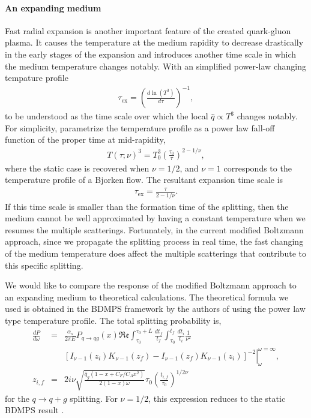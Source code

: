 \paragraph{An expanding medium}
Fast radial expansion is another important feature of the created quark-gluon plasma. 
It causes the temperature at the medium rapidity to decrease drastically in the early stages of the expansion and introduces another time scale in which the medium temperature changes notably.
With an simplified power-law changing tempature profile
\begin{eqnarray}
\tau_{\textrm{ex}} = \left(\frac{d\ln(T^3)}{d \tau} \right)^{-1},
\end{eqnarray}
to be understood as the time scale over which the local $\hat{q}\propto T^3$ changes notably.
For simplicity, parametrize the temperature profile as a power law fall-off function of the proper time at mid-rapidity,
\begin{eqnarray}
T(\tau; \nu)^3 = T_0^3\left(\frac{\tau_0}{\tau}\right)^{2-1/\nu},
\end{eqnarray}
where the static case is recovered when $\nu=1/2$, and $\nu=1$ corresponds to the temperature profile of a Bjorken flow.
The resultant expansion time scale is
\begin{eqnarray}
\tau_{\textrm{ex}} = \frac{\tau}{2-1/\nu}.
\end{eqnarray}
If this time scale is smaller than the formation time of the splitting, then the medium cannot be well approximated by having a constant temperature when we resumes the multiple scatterings.
Fortunately, in the current modified Boltzmann approach, since we propagate the splitting process in real time, the fast changing of the medium temperature does affect the multiple scatterings that contribute to this specific splitting.

We would like to compare the response of the modified Boltzmann approach to an expanding medium to theoretical calculations.
The theoretical formula we used is obtained in the BDMPS framework 
by the authors of \cite{Baier:1998yf} using the power law type temperature profile. 
The total splitting probability is,
\begin{eqnarray}
\frac{dP}{d\omega} &=& \frac{\alpha_s}{2\pi E}P_{q\rightarrow qg}(x)\mathfrak{Re}\int_{\tau_0}^{\tau_0+L}\frac{dt_f}{t_f}\int_{\tau_0}^{t_f}\frac{dt_i}{t_i} \frac{1}{\nu^2}\\
\nonumber
&& \left.\left[ I_{\nu-1}(z_i)K_{\nu-1}(z_f)-I_{\nu-1}(z_f)K_{\nu-1}(z_i)\right]^{-2}\right|_{\omega}^{\omega=\infty},\\
z_{i,f} &=& 2i\nu \sqrt{\frac{\hat{q}_g(1-x+C_F/C_A x^2)}{2(1-x)\omega}} \tau_0 \left( \frac{t_{i,f}}{\tau_0}\right) ^{1/2\nu}
\end{eqnarray}
for the $q\rightarrow q+g$ splitting.
For $\nu=1/2$, this expression reduces to the static BDMPS result \cite{Baier:1996kr}. 

